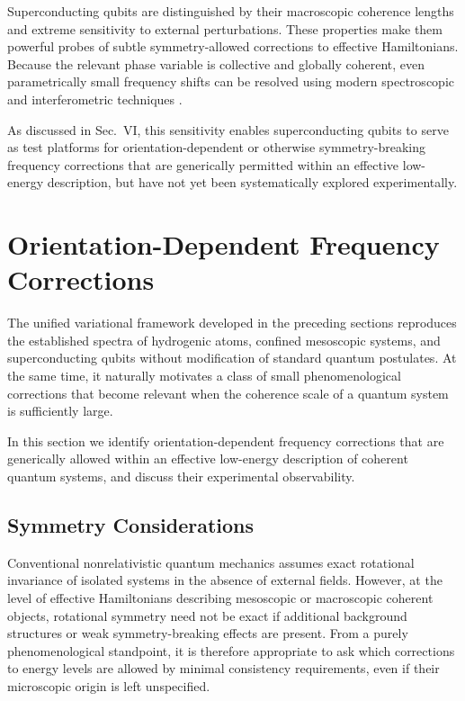 \documentclass[11pt]{article}
\begin{document}
            Superconducting qubits are distinguished by their macroscopic coherence lengths and extreme sensitivity to external perturbations. These properties make them powerful probes of subtle symmetry-allowed corrections to effective Hamiltonians. Because the relevant phase variable is collective and globally coherent, even parametrically small frequency shifts can be resolved using modern spectroscopic and interferometric techniques \cite{Koch2007,ClarkeWilhelm2008}.

            As discussed in Sec.~VI, this sensitivity enables superconducting qubits to serve as test platforms for orientation-dependent or otherwise symmetry-breaking frequency corrections that are generically permitted within an effective low-energy description, but have not yet been systematically explored experimentally.

    \section{Orientation-Dependent Frequency Corrections}

        The unified variational framework developed in the preceding sections reproduces the established spectra of hydrogenic atoms, confined mesoscopic systems, and superconducting qubits without modification of standard quantum postulates. At the same time, it naturally motivates a class of small phenomenological corrections that become relevant when the coherence scale of a quantum system is sufficiently large.

        In this section we identify orientation-dependent frequency corrections that are generically allowed within an effective low-energy description of coherent quantum systems, and discuss their experimental observability.

        \subsection{Symmetry Considerations}

            Conventional nonrelativistic quantum mechanics assumes exact rotational invariance of isolated systems in the absence of external fields. However, at the level of effective Hamiltonians describing mesoscopic or macroscopic coherent objects, rotational symmetry need not be exact if additional background structures or weak symmetry-breaking effects are present. From a purely phenomenological standpoint, it is therefore appropriate to ask which corrections to energy levels are allowed by minimal consistency requirements, even if their microscopic origin is left unspecified.
\end{document}
